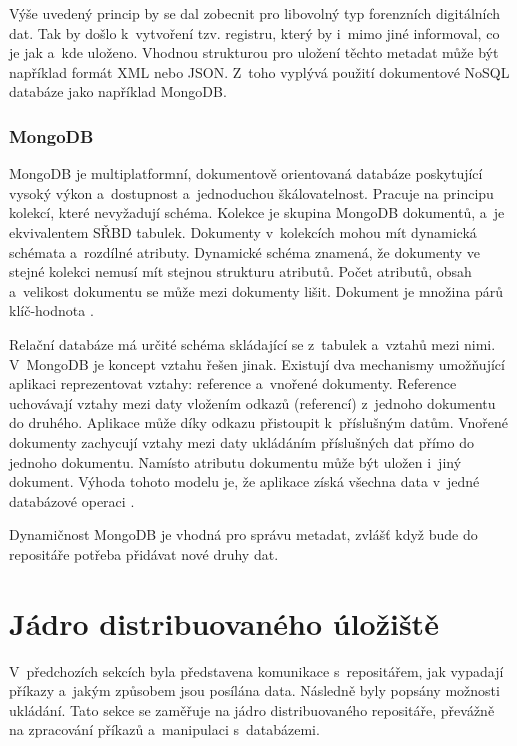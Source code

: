 Výše uvedený princip by se dal zobecnit pro libovolný typ forenzních digitálních dat. Tak by došlo k~vytvoření tzv. registru, který by i~mimo jiné informoval, co je jak a~kde uloženo. Vhodnou strukturou pro uložení těchto metadat může být například formát XML nebo JSON. Z~toho vyplývá použití dokumentové NoSQL databáze jako například MongoDB.

\subsubsection{MongoDB}
MongoDB je multiplatformní, dokumentově orientovaná databáze poskytující vysoký výkon a~dostupnost a~jednoduchou škálovatelnost. Pracuje na principu kolekcí, které nevyžadují schéma. Kolekce je skupina MongoDB dokumentů, a~je ekvivalentem SŘBD tabulek. Dokumenty v~kolekcích mohou mít dynamická schémata a~rozdílné atributy. Dynamické schéma znamená, že dokumenty ve stejné kolekci nemusí mít stejnou strukturu atributů. Počet atributů, obsah a~velikost dokumentu se může mezi dokumenty lišit. Dokument je množina párů klíč-hodnota \cite{mongoDBTutorialsPoint}.

Relační databáze má určité schéma skládající se z~tabulek a~vztahů mezi nimi. V~MongoDB je koncept vztahu řešen jinak. Existují dva mechanismy umožňující aplikaci reprezentovat vztahy: reference a~vnořené dokumenty. Reference uchovávají vztahy mezi daty vložením odkazů (referencí) z~jednoho dokumentu do druhého. Aplikace může díky odkazu přistoupit k~příslušným datům. Vnořené dokumenty zachycují vztahy mezi daty ukládáním příslušných dat přímo do jednoho dokumentu. Namísto atributu dokumentu může být uložen i~jiný dokument. Výhoda tohoto modelu je, že aplikace získá všechna data v~jedné databázové operaci \cite{mongoDBDataModelingIntro}.

Dynamičnost MongoDB je vhodná pro správu metadat, zvlášť když bude do repositáře potřeba přidávat nové druhy dat.

\section{Jádro distribuovaného úložiště}
V~předchozích sekcích byla představena komunikace s~repositářem, jak vypadají příkazy a~jakým způsobem jsou posílána data. Následně byly popsány možnosti ukládání. Tato sekce se zaměřuje na jádro distribuovaného repositáře, převážně na zpracování příkazů a~manipulaci s~databázemi.

